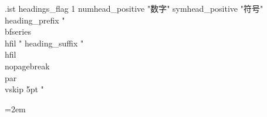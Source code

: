 \begin{filecontents*}[overwrite]{\jobname.ist}
headings_flag 1
numhead_positive "数字"
symhead_positive "符号"
heading_prefix "{\\bfseries\\hfil "
heading_suffix "\\hfil}\\nopagebreak\\par\\vskip 5pt "
\end{filecontents*}


\usepackage[a4paper,margin=28mm,headheight=15pt]{geometry}
\usepackage{amsmath,amssymb,mathtools,amsthm,bm}
\usepackage{graphicx}
\usepackage{tikz}
\usepackage{booktabs,longtable,array}
\usepackage{multicol}
\usepackage{enumitem}
\usepackage{xcolor}
\usepackage{fancyhdr}
\usepackage{imakeidx}
\makeindex[title={译本术语索引},intoc,noautomatic]
\usepackage{hyperref}

\renewcommand{\contentsname}{目录}
\renewcommand{\figurename}{图}
\renewcommand{\tablename}{表}


\setcounter{secnumdepth}{3}
\setcounter{tocdepth}{2}
\setlength{\parindent}{2em}
\setlength{\parskip}{0pt}
\emergencystretch=2em

\pagestyle{fancy}
\fancyhf{}
\fancyhead[LE]{\small\thepage\quad\nouppercase{\leftmark}}
\fancyhead[RO]{\small\nouppercase{\rightmark}\quad\thepage}
\renewcommand{\headrulewidth}{0.4pt}

\newtheorem{theorem}{定理}[section]
\newtheorem{proposition}[theorem]{命题}
\newtheorem{lemma}[theorem]{引理}
\newtheorem{corollary}[theorem]{推论}
\newtheorem{conjecture}[theorem]{猜想}
\newtheorem{question}[theorem]{问题}
\newtheorem*{namedtheorem}{定理}
\newtheorem*{namedproposition}{命题}
\theoremstyle{definition}
\newtheorem{definition}[theorem]{定义}
\newtheorem{example}[theorem]{例}
\newtheorem{exercise}[theorem]{习题}
\newtheorem*{nameddefinition}{定义}
\newtheorem*{namedexample}{例}
\theoremstyle{remark}
\newtheorem{remark}[theorem]{注}
\renewcommand{\proofname}{证明}


